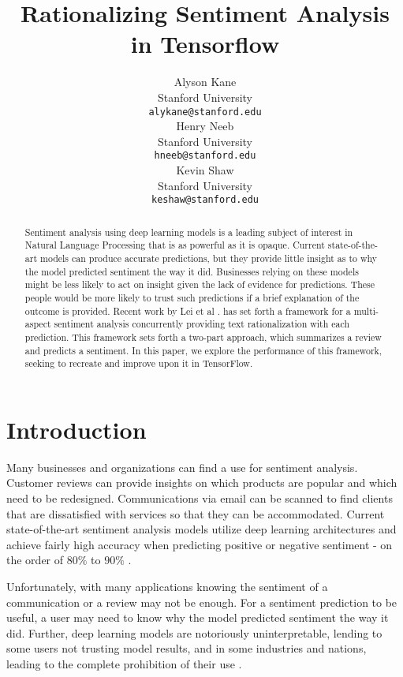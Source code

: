 \documentclass{article} %
\title{Rationalizing Sentiment Analysis in Tensorflow}
\author{
Alyson Kane \\
Stanford University\\
\texttt{alykane@stanford.edu} \\
\And
Henry Neeb \\
Stanford University\\
\texttt{hneeb@stanford.edu}\\
\And
Kevin Shaw \\
Stanford University\\
\texttt{keshaw@stanford.edu}\\
}
\begin{document}
\maketitle

\begin{abstract}

Sentiment analysis using deep learning models is a leading subject of interest
in Natural Language Processing that is as powerful as it is opaque. Current
state-of-the-art models can produce accurate predictions, but they provide
little insight as to why the model predicted sentiment the way it did.
Businesses relying on these models might be less likely to act on insight given
the lack of evidence for predictions. These people would be more likely to trust
such predictions if a brief explanation of the outcome is provided. Recent work
by Lei et al \cite{Lei}. has set forth a framework for a multi-aspect sentiment
analysis concurrently providing text rationalization with each prediction. This
framework sets forth a two-part approach, which summarizes a review and predicts
a sentiment. In this paper, we explore the performance of this framework,
seeking to recreate and improve upon it in TensorFlow.

\end{abstract}

\section{Introduction}

Many businesses and organizations can find a use for sentiment analysis.
Customer reviews can provide insights on which products are popular and which
need to be redesigned. Communications via email can be scanned to find clients
that are dissatisfied with services so that they can be accommodated. Current
state-of-the-art sentiment analysis models utilize deep learning architectures
and achieve fairly high accuracy when predicting positive or negative sentiment
- on the order of $80\%$ to $90\%$ \cite{Socher}.

Unfortunately, with many applications knowing the sentiment of a communication
or a review may not be enough. For a sentiment prediction to be useful, a user
may need to know why the model predicted sentiment the way it did. Further, deep
learning models are notoriously uninterpretable, lending to some users not
trusting model results, and in some industries and nations, leading to the
complete prohibition of their use \cite{Goodman}.
\end{document}
